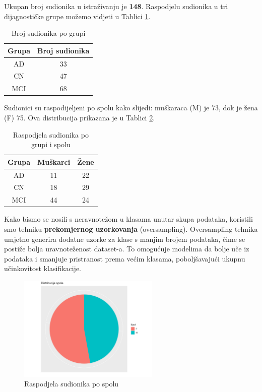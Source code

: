 \documentclass[zavrsnirad]{fer}
\begin{document}
Ukupan broj sudionika u istraživanju je \textbf{148}. Raspodjelu sudionika u tri dijagnostičke grupe možemo vidjeti u Tablici \ref{tab:brojsudionikapogrupi}.

\begin{table}[ht]
	\centering
	\begin{tabular}{|c|c|}
		\hline
		\textbf{Grupa} & \textbf{Broj sudionika} \\
		\hline
		AD & 33 \\
		CN & 47 \\
		MCI & 68 \\
		\hline
	\end{tabular}
	\caption{Broj sudionika po grupi}
	\label{tab:brojsudionikapogrupi}
\end{table}

Sudionici su raspodijeljeni po spolu kako slijedi: muškaraca (M) je 73, dok je žena (F) 75. Ova distribucija prikazana je u Tablici \ref{tab:raspodjelaspol}.

\begin{table}[ht]
	\centering
	\begin{tabular}{|c|c|c|}
		\hline
		\textbf{Grupa} & \textbf{Muškarci} & \textbf{Žene} \\
		\hline
		AD & 11 & 22 \\
		CN & 18 & 29 \\
		MCI & 44 & 24 \\
		\hline
	\end{tabular}
	\caption{Raspodjela sudionika po grupi i spolu}
	\label{tab:raspodjelaspol}
\end{table}

Kako bismo se nosili s neravnotežom u klasama unutar skupa podataka, koristili smo tehniku \textbf{prekomjernog uzorkovanja }(oversampling). Oversampling tehnika umjetno generira dodatne uzorke za klase s manjim brojem podataka, čime se postiže bolja uravnoteženost dataset-a. To omogućuje modelima da bolje uče iz podataka i smanjuje pristranost prema većim klasama, poboljšavajući ukupnu učinkovitost klasifikacije. 

\begin{figure}[h]
	\centering
	\includegraphics[width=0.6\textwidth]{Figures/pie_chart_spola.png}
	\caption{Raspodjela sudionika po spolu}
	\label{fig:spol}
\end{figure}
\end{document}
